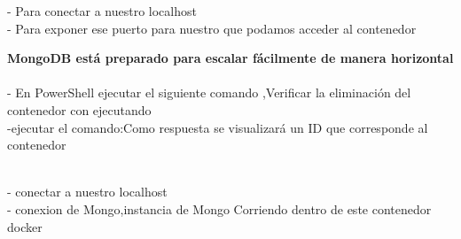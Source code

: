 \documentclass[twoside,onecolumn]{article}
\begin{document}
\begin{flushright}
\begin{itemize}
- Para conectar  a nuestro localhost 
\textbf{}\\
- Para exponer ese puerto para nuestro que podamos  acceder al contenedor


\textbf{ MongoDB está preparado para escalar fácilmente de manera horizontal}\\

\textbf{}\\
 - En PowerShell ejecutar el siguiente comando ,Verificar la eliminación del contenedor con ejecutando
\textbf{}\\

 -ejecutar el comando:Como respuesta se visualizará un ID que corresponde al contenedor

\textbf{}\\
 - conectar  a nuestro localhost 
\textbf{}\\
 - conexion de Mongo,instancia de Mongo Corriendo dentro de este contenedor docker 



\textbf{}\\

\end{itemize}
\end{flushright}
\end{document}
